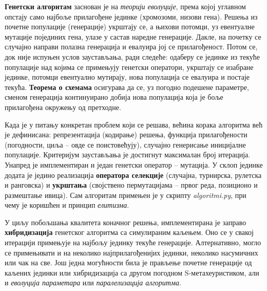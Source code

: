 \documentclass[a4paper]{article}
\begin{document}
\textbf{Генетски алгоритам} заснован је на \textit{теорији еволуције}, према којој углавном опстају само најбоље прилагођене јединке (хромозоми, низови гена). Решења из почетне популације (генерације) укрштају се, а њихови потомци, уз евентуалне мутације појединих гена, улазе у састав наредне генерације. Дакле, на почетку се случајно направи полазна генерација и евалуира јој се прилагођеност. Потом се, док није испуњен услов заустављања, ради следеће: одаберу се јединке из текуће популације над којима се примењују генетски оператори, укрштају се изабране јединке, потомци евентуално мутирају, нова популација се евалуира и постаје текућа. \textbf{Теорема о схемама} осигурава да се, уз погодно подешене параметре, сменом генерација континуирано добија нова популација која је боље прилагођена окружењу од претходне.

Када је у питању конкретан проблем који се решава, већина корака алгоритма већ је дефинисана: репрезентација (кодирање) решења, функција прилагођености (погодности, циља -- овде се поистовећују), случајно генерисање иницијалне популације. Критеријум заустављања је достигнут максималан број итерација. Унапред је имплементиран и један генетски оператор -- мутација. У склоп јединке додата је једино реализација \textbf{оператора селекције} (случајна, турнирска, рулетска и ранговска) и \textbf{укрштања} (својствено пермутацијама -- првог реда, позиционо и размештање ивица). Сам алгоритам примењен је у скрипту \textit{algoritmi.py}, при чему је коришћен и принцип \textit{елитизма}.

У циљу побољшања квалитета коначног решења, имплементирана је заправо \textbf{хибридизација} генетског алгоритма са симулираним каљењем. Оно се у свакој итерацији примењује на најбољу јединку текуће генерације. Алтернативно, могло се примењивати и на неколико најприлагођенијих јединки, неколико насумичних или чак на све. Још једна могућности била је прављење почетне генерације од каљених јединки или хибридизација са другом погодном S-метахеуристиком, али и \textit{еволуција параметара} или \textit{паралелизација алгоритма}.
\end{document}
